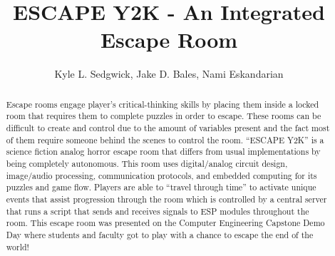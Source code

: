 \documentclass[conference]{IEEEtran}
\begin{document}
\title{ESCAPE Y2K - An Integrated Escape Room}

\author{Kyle L. Sedgwick, Jake D. Bales, Nami Eskandarian}

\author{
    \and
    \and
}



\maketitle

\begin{abstract}
    Escape rooms engage player's critical-thinking skills by placing them inside a locked room
    that requires them to complete puzzles in order to escape. These rooms can be difficult to
    create and control due to the amount of variables present and the fact most of them require
    someone behind the scenes to control the room. “ESCAPE Y2K” is a science fiction analog horror 
    escape room that differs from usual implementations by being completely autonomous. This room 
    uses digital/analog circuit design, image/audio processing, communication protocols, and embedded
    computing for its puzzles and game flow. Players are able to ``travel through time'' to activate
    unique events that assist progression through the room which is controlled by a central server
    that runs a script that sends and receives signals to ESP modules throughout the room. This escape
    room was presented on the Computer Engineering Capstone Demo Day where students and faculty got
    to play with a chance to escape the end of the world!
\end{abstract}
\end{document}

